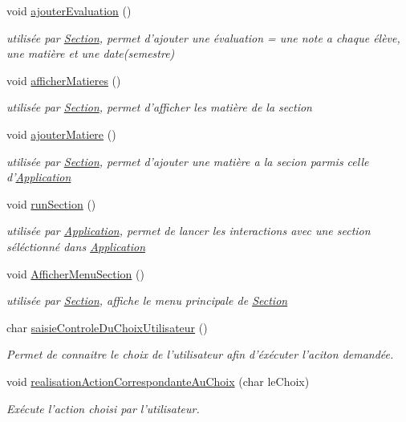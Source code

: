 \begin{DoxyCompactItemize}
void \hyperlink{class_section_a7ca7b4088ad4326533a300581ac6f6a0}{ajouter\+Evaluation} ()
\begin{DoxyCompactList}\small\item\em utilisée par \hyperlink{class_section}{Section}, permet d'ajouter une évaluation = une note a chaque élève, une matière et une date(semestre) \end{DoxyCompactList}\item 
void \hyperlink{class_section_aad00712e76a9116295cd48ca475e4289}{afficher\+Matieres} ()
\begin{DoxyCompactList}\small\item\em utilisée par \hyperlink{class_section}{Section}, permet d'afficher les matière de la section \end{DoxyCompactList}\item 
void \hyperlink{class_section_af834dd53f188641f0b1cc24d7d18e919}{ajouter\+Matiere} ()
\begin{DoxyCompactList}\small\item\em utilisée par \hyperlink{class_section}{Section}, permet d'ajouter une matière a la secion parmis celle d'\hyperlink{class_application}{Application} \end{DoxyCompactList}\item 
void \hyperlink{class_section_a27cba40cc111707559dce0dfd4c5bf61}{run\+Section} ()
\begin{DoxyCompactList}\small\item\em utilisée par \hyperlink{class_application}{Application}, permet de lancer les interactions avec une section séléctionné dans \hyperlink{class_application}{Application} \end{DoxyCompactList}\item 
void \hyperlink{class_section_a37f98cee5c7b99d30d29cc829a541ea6}{Afficher\+Menu\+Section} ()
\begin{DoxyCompactList}\small\item\em utilisée par \hyperlink{class_section}{Section}, affiche le menu principale de \hyperlink{class_section}{Section} \end{DoxyCompactList}\item 
char \hyperlink{class_section_a1bff0e887b4858183de5baf404922989}{saisie\+Controle\+Du\+Choix\+Utilisateur} ()
\begin{DoxyCompactList}\small\item\em Permet de connaitre le choix de l'utilisateur afin d'éxécuter l'aciton demandée. \end{DoxyCompactList}\item 
void \hyperlink{class_section_aa17b8729ea8bac8a936c2a34a03a06a2}{realisation\+Action\+Correspondante\+Au\+Choix} (char le\+Choix)
\begin{DoxyCompactList}\small\item\em Exécute l'action choisi par l'utilisateur. \end{DoxyCompactList}\end{DoxyCompactItemize}
